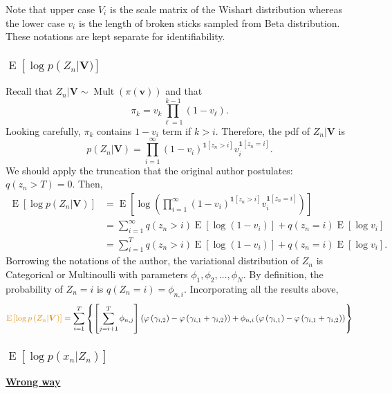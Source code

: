 \documentclass[11pt]{article}
\newcommand{\bs}{\boldsymbol}
\newcommand{\opn}{\operatorname}
\begin{document}
Note that upper case $V_{i}$ is the scale matrix of the Wishart distribution whereas the lower case $v_{i}$ is the length of broken sticks sampled from Beta distribution. These notations are kept separate for identifiability.
\subsubsection{$\opn{E}\left[\log p \left(Z_{n}|\bs{V}) \right]$}
Recall that $Z_{n}|\bs{V} \sim \opn{Mult}\left(\pi\left(\bs{v}\right)\right)$ and that
$$
  \pi_{k} = v_{k}\prod_{\ell=1}^{k-1}\left(1-v_{\ell} \right).
$$
Looking carefully, $\pi_{k}$ contains $1-v_{i}$ term if $k>i$. Therefore, the pdf of $Z_{n}|\bs{V}$ is
$$
  p \left(Z_{n}|\bs{V}\right) = \prod_{i=1}^{\infty} \left(1-v_{i}\right)^{\bs{1}\left[z_{n}>i\right]}v_{i}^{\bs{1}\left[z_{n}=i\right]}.
$$
We should apply the truncation that the original author postulates: $q\left(z_{n}>T\right)=0$. Then,
\begin{align*}
  \opn{E}\left[\log p\left(Z_{n}|\bs{V}\right) \right] &= \opn{E}\left[\log \left(\prod_{i=1}^{\infty} \left(1-v_{i}\right)^{\bs{1}\left[z_{n}>i \right]} v_{i}^{\bs{1}\left[z_{n}=i \right]} \right) \right]\\
  &= \sum_{i=1}^{\infty}q\left(z_{n}>i \right) \opn{E}\left[\log \left(1-v_{i}\right) \right] + q\left(z_{n}=i\right)\opn{E}\left[\log v_{i} \right]\\
  &= \sum_{i=1}^{T}q\left(z_{n}>i\right)\opn{E}\left[\log \left(1-v_{i}\right) \right] + q\left(z_{n}=i\right)\opn{E}\left[\log v_{i}\right].
\end{align*}
Borrowing the notations of the author, the variational distribution of $Z_{n}$ is Categorical or Multinoulli with parameters $\phi_{1}, \phi_{2}, \ldots , \phi_{N}$. By definition, the probability of $Z_{n}=i$ is $q\left(Z_{n}=i \right) = \phi_{n,i}$. Incorporating all the results above,
\begin{align*}
  \textcolor{myorange}{\opn{E}\left[\log p \left(Z_{n}|\bs{V}\right) \right]} = \sum_{i=1}^{T}\left\{\left[\sum_{j=i+1}^{T}\phi_{n,j}\right] \left(\varphi\left(\gamma_{i,2} \right)-\varphi\left(\gamma_{i,1}+\gamma_{i,2} \right) \right) + \phi_{n,i}\left(\varphi\left(\gamma_{i,1} \right)-\varphi\left(\gamma_{i,1}+\gamma_{i,2} \right) \right)\right\}
\end{align*}
\subsubsection{$\opn{E}\left[\log p \left(x_{n}|Z_{n}\right) \right] $}
\underline{\textbf{Wrong way}}\par
\end{document}
